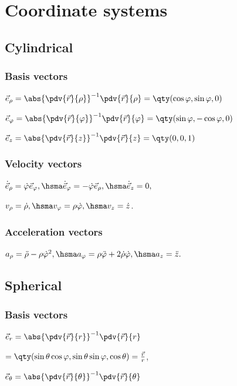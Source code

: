 
\section{Coordinate systems}



\subsection{Cylindrical}



\subsubsection*{Basis vectors}

$\vec{e}_{\rho}=\abs{\pdv{\vec{r}}{\rho}}^{-1}\pdv{\vec{r}}{\rho}=\qty(\cos\varphi,\sin\varphi,0)$

$\vec{e}_{\varphi}=\abs{\pdv{\vec{r}}{\varphi}}^{-1}\pdv{\vec{r}}{\varphi}=\qty(\sin\varphi,-\cos\varphi,0)$

$\vec{e}_{z}=\abs{\pdv{\vec{r}}{z}}^{-1}\pdv{\vec{r}}{z}=\qty(0,0,1)$
\subsubsection*{Velocity vectors}
$\dot{\vec{e}}_{\rho}=\dot{\varphi}\vec{e}_{\varphi},\hsma \dot{\vec{e}}_{\varphi}=-\dot{\varphi}\vec{e}_{\rho},\hsma \dot{\vec{e}}_{z}=0,$

$v_{\rho}=\dot{\rho},\hsma v_{\varphi}=\rho\dot{\varphi},\hsma v_{z}=\dot{z}$.                
\subsubsection*{Acceleration vectors}
$a_{\rho}=\ddot{\rho}-\rho\dot{\varphi}^{2},\hsma a_{\varphi}=\rho\ddot{\varphi}+2\dot{\rho}\dot{\varphi},\hsma a_{z}=\ddot{z}.$


\subsection{Spherical}
\subsubsection*{Basis vectors}
$\vec{e}_{r}=\abs{\pdv{\vec{r}}{r}}^{-1}\pdv{\vec{r}}{r}$

$=\qty(\sin\theta\cos\varphi,\sin\theta\sin\varphi,\cos\theta)=\frac{\vec{r}}{r}$,

$\vec{e}_{\theta}=\abs{\pdv{\vec{r}}{\theta}}^{-1}\pdv{\vec{r}}{\theta}$

